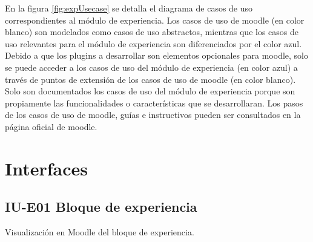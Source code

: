      \clearpage
    
    En la figura \ref{fig:expUsecase} se detalla el diagrama de casos de uso correspondientes al módulo de experiencia. Los casos de uso de moodle (en color blanco) son modelados como casos de uso abstractos, mientras que los casos de uso relevantes para el módulo de experiencia son diferenciados por el color azul.\\
    
    
    \noindent Debido a que los plugins a desarrollar son elementos opcionales para moodle, solo se puede acceder a los casos de uso del módulo de experiencia (en color azul) a través de puntos de extensión de los casos de uso de moodle (en color blanco).\\
    
    \noindent Solo son documentados los casos de uso del módulo de experiencia porque son propiamente las funcionalidades o características que se desarrollaran. Los pasos de los casos de uso de moodle, guías e instructivos pueden ser consultados en la página oficial de moodle.
    \clearpage
    
    
\section{Interfaces}
    
\subsection*{IU-E01 Bloque de experiencia}
\label{IUE01}

    Visualización en Moodle del bloque de experiencia.

    
